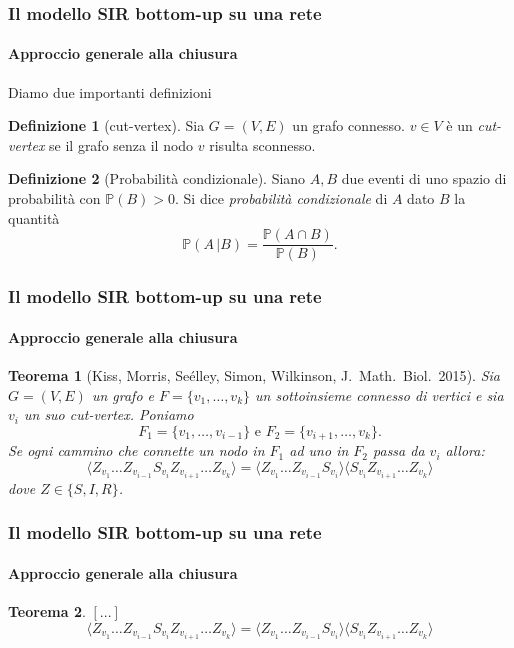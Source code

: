 \documentclass{beamer}
\newcommand{\angol}[1]{\langle #1 \rangle}
\theoremstyle{definition}
\newtheorem{defn}{Definizione}
\theoremstyle{plain}
\newtheorem{thm}{Teorema}
\begin{document}
{
\logo{}
\begin{frame}
\frametitle{Il modello SIR bottom-up su una rete}
\framesubtitle{Approccio generale alla chiusura}
Diamo due importanti definizioni
    \begin{defn}[cut-vertex]
    Sia $G=(V,E)$ un grafo connesso. $v\in V$ \`e un \textit{cut-vertex} se il grafo senza il nodo $v$ risulta sconnesso.
    \end{defn}
    \pause 
    \begin{defn}[Probabilit\`a condizionale]
    Siano $A,B$ due eventi di uno spazio di probabilit\`a con $\mathbb{P}(B)>0$. Si dice \textit{probabilit\`a condizionale} di $A$ dato $B$ la quantit\`a
    $$ \mathbb{P}(A\, \vert B) = \frac{ \mathbb{P}(A\cap B)}{\mathbb{P}(B)}.$$
    \end{defn}
\end{frame}

\begin{frame}
\frametitle{Il modello SIR bottom-up su una rete}
\framesubtitle{Approccio generale alla chiusura}
\begin{thm}[\small{Kiss, Morris, Se\'elley, Simon, Wilkinson, J.~Math.~Biol.~2015}]
Sia $G=(V,E)$ un grafo e $F=\{ v_1, \dots, v_k\}$ un sottoinsieme connesso di vertici e sia $v_i$ un suo cut-vertex. Poniamo  $$ F_1 = \{ v_1, \dots, v_{i-1}\} \text{ e }  F_2 =\{ v_{i+1}, \dots, v_k\}.$$ 
Se ogni cammino che connette un nodo in $F_1$ ad uno in $F_2$ passa da $v_i$ allora: 
\begin{equation*}\angol{ Z_{v_1}\dots Z_{v_{i-1}} S_{v_i} Z_{v_{i+1}} \dots Z_{v_k}} = \angol{ Z_{v_1}\dots Z_{v_{i-1}} S_{v_i}} \angol{S_{v_i}  Z_{v_{i+1}} \dots Z_{v_k}}	
\end{equation*}
dove $Z\in \{ S,I,R\}$. 
\end{thm}
\end{frame}

\begin{frame}
\frametitle{Il modello SIR bottom-up su una rete}
\framesubtitle{Approccio generale alla chiusura}

\small {
\begin{thm} $[...]$
\begin{equation*}\angol{ Z_{v_1}\dots Z_{v_{i-1}} S_{v_i} Z_{v_{i+1}} \dots Z_{v_k}} = \angol{ Z_{v_1}\dots Z_{v_{i-1}} S_{v_i}} \angol{S_{v_i}  Z_{v_{i+1}} \dots Z_{v_k}}	
\end{equation*}
\end{thm}}



\end{frame}}
\end{document}
